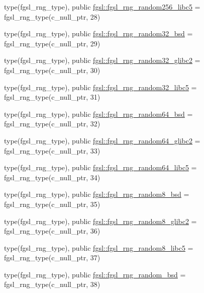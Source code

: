 \begin{DoxyCompactItemize}
type(fgsl\+\_\+rng\+\_\+type), public \hyperlink{namespacefgsl_a07865f4f3a0cd07f3e922da1b3616e68}{fgsl\+::fgsl\+\_\+rng\+\_\+random256\+\_\+libc5} = fgsl\+\_\+rng\+\_\+type(c\+\_\+null\+\_\+ptr, 28)
\item 
type(fgsl\+\_\+rng\+\_\+type), public \hyperlink{namespacefgsl_a1adf276b8f59b011e5a28451b9245a96}{fgsl\+::fgsl\+\_\+rng\+\_\+random32\+\_\+bsd} = fgsl\+\_\+rng\+\_\+type(c\+\_\+null\+\_\+ptr, 29)
\item 
type(fgsl\+\_\+rng\+\_\+type), public \hyperlink{namespacefgsl_a26cb9ca6b94f3b1db24cdc006f07196a}{fgsl\+::fgsl\+\_\+rng\+\_\+random32\+\_\+glibc2} = fgsl\+\_\+rng\+\_\+type(c\+\_\+null\+\_\+ptr, 30)
\item 
type(fgsl\+\_\+rng\+\_\+type), public \hyperlink{namespacefgsl_a85c8b85216d7705c54a071e06a65d871}{fgsl\+::fgsl\+\_\+rng\+\_\+random32\+\_\+libc5} = fgsl\+\_\+rng\+\_\+type(c\+\_\+null\+\_\+ptr, 31)
\item 
type(fgsl\+\_\+rng\+\_\+type), public \hyperlink{namespacefgsl_a4f1fadb8ae8e69bc97fa0ce10b8c2669}{fgsl\+::fgsl\+\_\+rng\+\_\+random64\+\_\+bsd} = fgsl\+\_\+rng\+\_\+type(c\+\_\+null\+\_\+ptr, 32)
\item 
type(fgsl\+\_\+rng\+\_\+type), public \hyperlink{namespacefgsl_afa30a9f9486fc4a3ebc5c98fdf7c2734}{fgsl\+::fgsl\+\_\+rng\+\_\+random64\+\_\+glibc2} = fgsl\+\_\+rng\+\_\+type(c\+\_\+null\+\_\+ptr, 33)
\item 
type(fgsl\+\_\+rng\+\_\+type), public \hyperlink{namespacefgsl_a5d485fce442bdf380a13906f23f519cb}{fgsl\+::fgsl\+\_\+rng\+\_\+random64\+\_\+libc5} = fgsl\+\_\+rng\+\_\+type(c\+\_\+null\+\_\+ptr, 34)
\item 
type(fgsl\+\_\+rng\+\_\+type), public \hyperlink{namespacefgsl_a03a999d95485529c23b1eeb38284dd6a}{fgsl\+::fgsl\+\_\+rng\+\_\+random8\+\_\+bsd} = fgsl\+\_\+rng\+\_\+type(c\+\_\+null\+\_\+ptr, 35)
\item 
type(fgsl\+\_\+rng\+\_\+type), public \hyperlink{namespacefgsl_a6028caefc0e3a940d1ee57801f7fd438}{fgsl\+::fgsl\+\_\+rng\+\_\+random8\+\_\+glibc2} = fgsl\+\_\+rng\+\_\+type(c\+\_\+null\+\_\+ptr, 36)
\item 
type(fgsl\+\_\+rng\+\_\+type), public \hyperlink{namespacefgsl_a2cce36d84f84109ec9e54bd0d252bbb3}{fgsl\+::fgsl\+\_\+rng\+\_\+random8\+\_\+libc5} = fgsl\+\_\+rng\+\_\+type(c\+\_\+null\+\_\+ptr, 37)
\item 
type(fgsl\+\_\+rng\+\_\+type), public \hyperlink{namespacefgsl_a087022fa0d8a304cfb59e544a14d0a3c}{fgsl\+::fgsl\+\_\+rng\+\_\+random\+\_\+bsd} = fgsl\+\_\+rng\+\_\+type(c\+\_\+null\+\_\+ptr, 38)

\end{DoxyCompactItemize}
